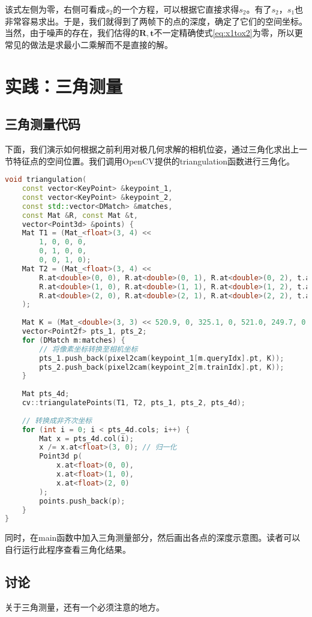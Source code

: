 该式左侧为零，右侧可看成$s_2$的一个方程，可以根据它直接求得$s_2$。有了$s_2$，$s_1$也非常容易求出。于是，我们就得到了两帧下的点的深度，确定了它们的空间坐标。当然，由于噪声的存在，我们估得的$\bm{R}, \bm{t}$不一定精确使式\eqref{eq:x1tox2}为零，所以更常见的做法是求最小二乘解而不是直接的解。

\section{实践：三角测量}
\subsection{三角测量代码}
下面，我们演示如何根据之前利用对极几何求解的相机位姿，通过三角化求出上一节特征点的空间位置。我们调用OpenCV提供的triangulation函数进行三角化。

\begin{lstlisting}[language=c++,caption=slambook2/ch7/triangulation.cpp（片段）]
void triangulation(
	const vector<KeyPoint> &keypoint_1,
	const vector<KeyPoint> &keypoint_2,
	const std::vector<DMatch> &matches,
	const Mat &R, const Mat &t,
	vector<Point3d> &points) {
	Mat T1 = (Mat_<float>(3, 4) <<
		1, 0, 0, 0,
		0, 1, 0, 0,
		0, 0, 1, 0);
	Mat T2 = (Mat_<float>(3, 4) <<
		R.at<double>(0, 0), R.at<double>(0, 1), R.at<double>(0, 2), t.at<double>(0, 0),
		R.at<double>(1, 0), R.at<double>(1, 1), R.at<double>(1, 2), t.at<double>(1, 0),
		R.at<double>(2, 0), R.at<double>(2, 1), R.at<double>(2, 2), t.at<double>(2, 0)
	);
	
	Mat K = (Mat_<double>(3, 3) << 520.9, 0, 325.1, 0, 521.0, 249.7, 0, 0, 1);
	vector<Point2f> pts_1, pts_2;
	for (DMatch m:matches) {
		// 将像素坐标转换至相机坐标
		pts_1.push_back(pixel2cam(keypoint_1[m.queryIdx].pt, K));
		pts_2.push_back(pixel2cam(keypoint_2[m.trainIdx].pt, K));
	}
	
	Mat pts_4d;
	cv::triangulatePoints(T1, T2, pts_1, pts_2, pts_4d);
	
	// 转换成非齐次坐标
	for (int i = 0; i < pts_4d.cols; i++) {
		Mat x = pts_4d.col(i);
		x /= x.at<float>(3, 0); // 归一化
		Point3d p(
			x.at<float>(0, 0),
			x.at<float>(1, 0),
			x.at<float>(2, 0)
		);
		points.push_back(p);
	}
}
\end{lstlisting}

同时，在main函数中加入三角测量部分，然后画出各点的深度示意图。读者可以自行运行此程序查看三角化结果。

\subsection{讨论}
关于三角测量，还有一个必须注意的地方。

